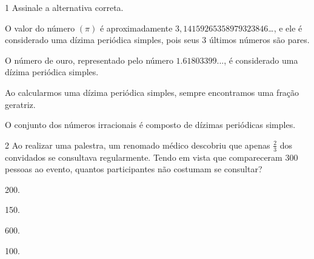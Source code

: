 \num{1} Assinale a alternativa correta.

\begin{escolha}[itemsep=0pt]
\item O valor do número $(\pi)$ é aproximadamente
$3,14159265358979323846$\ldots, e ele é considerado uma dízima periódica
simples, pois seus 3 últimos números são pares.
\item O número de ouro, representado pelo número $1.61803399$..., é considerado
uma dízima periódica simples.
\item Ao calcularmos uma dízima periódica simples, sempre encontramos uma
fração geratriz.
\item O conjunto dos números irracionais é composto de dízimas periódicas
simples.
\end{escolha}







\num{2} Ao realizar uma palestra, um renomado médico descobriu que apenas
$\frac{2}{3}$ dos convidados se consultava regularmente. Tendo em
vista que compareceram 300 pessoas ao evento, quantos participantes não
costumam se consultar?

\begin{multicols}{4}
\begin{escolha}[itemsep=0pt]
\item 200.
\item 150.
\item 600.
\item 100.
\end{escolha}
\end{multicols}


